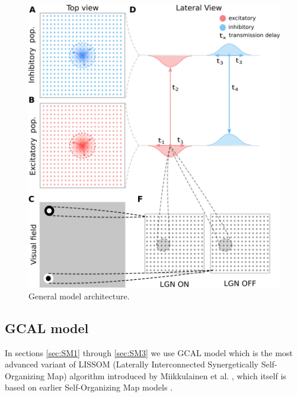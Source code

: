 \documentclass[a4paper,10pt]{article}
\begin{document}
\begin{figure}[htpb!] 
\centering
\includegraphics[width=16cm]{./SVG/FigureModelArchitecture/drawing.png}
\caption{General model architecture. }
\label{fig:model_architecture}
\end{figure} 


\subsection{GCAL model}

In sections \ref{sec:SM1} through \ref{sec:SM3} we use GCAL model \cite{Stevens2013}  which is the most advanced variant of LISSOM 
(Laterally Interconnected Synergetically Self-Organizing Map) algorithm introduced by Miikkulainen et al. \cite{CMVC}, 
which itself is based on earlier Self-Organizing Map models \cite{Kohonen1982}.
\end{document}
